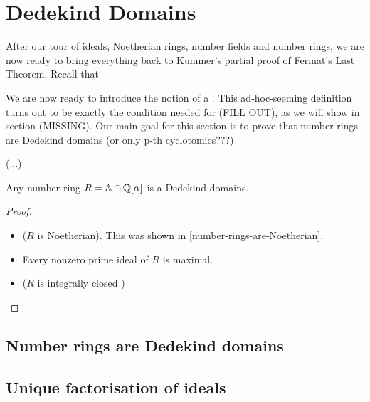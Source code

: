 \chapter{Dedekind Domains}
After our tour of ideals, Noetherian rings, number fields and number rings, we are now ready to bring everything back to Kummer's partial proof of Fermat's Last Theorem. Recall that 

We are now ready to introduce the notion of a . This ad-hoc-seeming definition turns out to be exactly the condition needed for (FILL OUT), as we will show in section (MISSING). Our main goal for this section is to prove that number rings are Dedekind domains (or only p-th cyclotomics???)

\begin{definition}
(...)
\end{definition}



\begin{proposition}
Any number ring $R=\mathbb{A}\cap \mathbb{Q}[\alpha]$ is a Dedekind domains.
\end{proposition}
\begin{proof}
\begin{itemize}
    \item ($R$ is Noetherian). This was shown in  \cref{number-rings-are-Noetherian}.
    \item Every nonzero prime ideal of $R$ is maximal.
    \item ($R$ is integrally closed )
\end{itemize}
\end{proof}
\section{Number rings are Dedekind domains}

\section{Unique factorisation of ideals}